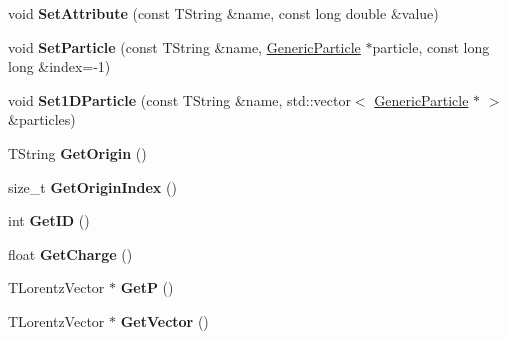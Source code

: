 \begin{DoxyCompactItemize}
\item 
\hypertarget{class_h_a_l_1_1_generic_particle_aacce9b75bb12d4a0b2ad69d9784527d9}{void {\bfseries Set\-Attribute} (const T\-String \&name, const long double \&value)}\label{class_h_a_l_1_1_generic_particle_aacce9b75bb12d4a0b2ad69d9784527d9}

\item 
\hypertarget{class_h_a_l_1_1_generic_particle_a779773d398f0555bfe65295e16494156}{void {\bfseries Set\-Particle} (const T\-String \&name, \hyperlink{class_h_a_l_1_1_generic_particle}{Generic\-Particle} $\ast$particle, const long long \&index=-\/1)}\label{class_h_a_l_1_1_generic_particle_a779773d398f0555bfe65295e16494156}

\item 
\hypertarget{class_h_a_l_1_1_generic_particle_a3f6c3bcf5eb3fafc2687a0622404c5b1}{void {\bfseries Set1\-D\-Particle} (const T\-String \&name, std\-::vector$<$ \hyperlink{class_h_a_l_1_1_generic_particle}{Generic\-Particle} $\ast$ $>$ \&particles)}\label{class_h_a_l_1_1_generic_particle_a3f6c3bcf5eb3fafc2687a0622404c5b1}

\item 
\hypertarget{class_h_a_l_1_1_generic_particle_a712c5e92caba83c8c1f0566d860d6a1e}{T\-String {\bfseries Get\-Origin} ()}\label{class_h_a_l_1_1_generic_particle_a712c5e92caba83c8c1f0566d860d6a1e}

\item 
\hypertarget{class_h_a_l_1_1_generic_particle_a6b38ac523f31d45da86d153913a25643}{size\-\_\-t {\bfseries Get\-Origin\-Index} ()}\label{class_h_a_l_1_1_generic_particle_a6b38ac523f31d45da86d153913a25643}

\item 
\hypertarget{class_h_a_l_1_1_generic_particle_adb269fa3b951f48d41d46f29501849a0}{int {\bfseries Get\-I\-D} ()}\label{class_h_a_l_1_1_generic_particle_adb269fa3b951f48d41d46f29501849a0}

\item 
\hypertarget{class_h_a_l_1_1_generic_particle_a2f681e1590dd3644844d99267c8f74ed}{float {\bfseries Get\-Charge} ()}\label{class_h_a_l_1_1_generic_particle_a2f681e1590dd3644844d99267c8f74ed}

\item 
\hypertarget{class_h_a_l_1_1_generic_particle_a113c67f6413960990c922e2c5bf63455}{T\-Lorentz\-Vector $\ast$ {\bfseries Get\-P} ()}\label{class_h_a_l_1_1_generic_particle_a113c67f6413960990c922e2c5bf63455}

\item 
\hypertarget{class_h_a_l_1_1_generic_particle_a22f27923168040b2f8273b909830a7fa}{T\-Lorentz\-Vector $\ast$ {\bfseries Get\-Vector} ()}\label{class_h_a_l_1_1_generic_particle_a22f27923168040b2f8273b909830a7fa}


\end{DoxyCompactItemize}
